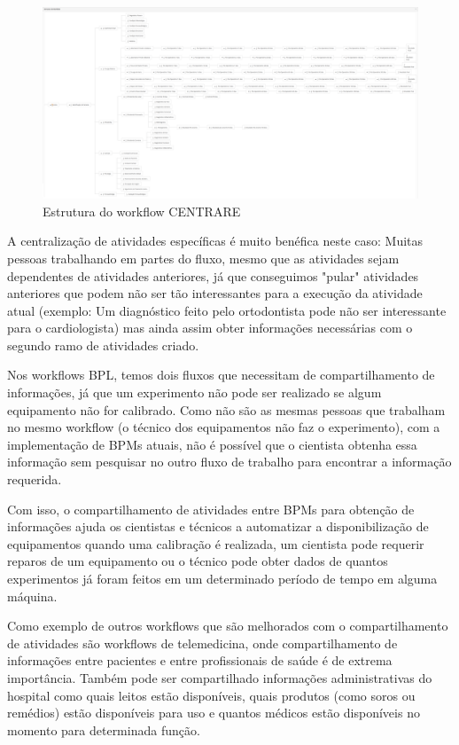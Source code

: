 \begin{figure}
    \centering
    \includegraphics[width=1\textwidth]{imgs/CENTRARE/estrutura.png}
    \caption{Estrutura do workflow CENTRARE}
    \label{fig:centrareEstrutura}
\end{figure}

A centralização de atividades específicas é muito benéfica neste caso: Muitas pessoas trabalhando em partes do fluxo, mesmo que as atividades sejam dependentes de atividades anteriores, já que conseguimos "pular" atividades anteriores que podem não ser tão interessantes para a execução da atividade atual (exemplo: Um diagnóstico feito pelo ortodontista pode não ser interessante para o cardiologista) mas ainda assim obter informações necessárias com o segundo ramo de atividades criado.

Nos workflows BPL, temos dois fluxos que necessitam de compartilhamento de informações, já que um experimento não pode ser realizado se algum equipamento não for calibrado. Como não são as mesmas pessoas que trabalham no mesmo workflow (o técnico dos equipamentos não faz o experimento), com a implementação de BPMs atuais, não é possível que o cientista obtenha essa informação sem pesquisar no outro fluxo de trabalho para encontrar a informação requerida.

Com isso, o compartilhamento de atividades entre BPMs para obtenção de informações ajuda os cientistas e técnicos a automatizar a disponibilização de equipamentos quando uma calibração é realizada, um cientista pode requerir reparos de um equipamento ou o técnico pode obter dados de quantos experimentos já foram feitos em um determinado período de tempo em alguma máquina.

Como exemplo de outros workflows que são melhorados com o compartilhamento de atividades são workflows de telemedicina, onde compartilhamento de informações entre pacientes e entre profissionais de saúde é de extrema importância. Também pode ser compartilhado informações administrativas do hospital como quais leitos estão disponíveis, quais produtos (como soros ou remédios) estão disponíveis para uso e quantos médicos estão disponíveis no momento para determinada função.

